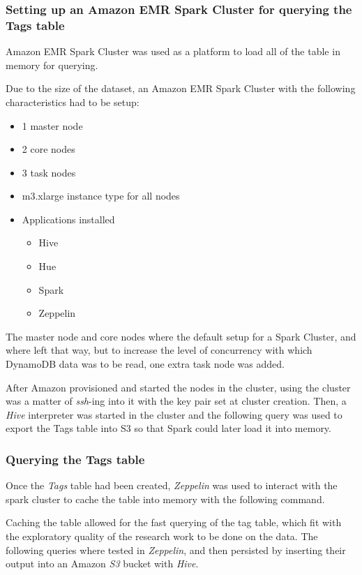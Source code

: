 \subsubsection{Setting up an Amazon EMR Spark Cluster for querying the Tags table}
Amazon EMR Spark Cluster  was used as a platform to load all of the table in memory for querying.

Due to the size of the dataset, an Amazon EMR Spark Cluster with the following characteristics had to be setup:
\begin{itemize}
  \item 1 master node
  \item 2 core nodes
  \item 3 task nodes
  \item m3.xlarge instance type for all nodes
  \item Applications installed
    \begin{itemize}
      \item Hive
      \item Hue
      \item Spark
      \item Zeppelin
    \end{itemize}
\end{itemize}
The master node and core nodes where the default setup for a Spark Cluster, and where left that way,
but to increase the level of concurrency with which DynamoDB data was to be read, one extra task node was added.

After Amazon provisioned and started the nodes in the cluster, using the cluster was a matter of
\textit{ssh}-ing into it with the key pair set at cluster creation. 
Then, a \textit{Hive}\cite{hive} interpreter was started in the cluster and the following query was used to export the Tags table into S3
so that Spark could later load it into memory.


\subsubsection{Querying the Tags table}
Once the \textit{Tags} table had been created, \textit{Zeppelin}\cite{zeppelin} was used to interact with the spark cluster to cache the table into memory with the following command.


Caching the table allowed for the fast querying of the tag table, which fit with the exploratory quality of the research work to be done on the data.
The following queries where tested in \textit{Zeppelin}, and then persisted by inserting their output into an Amazon \textit{S3} bucket with \textit{Hive}.





